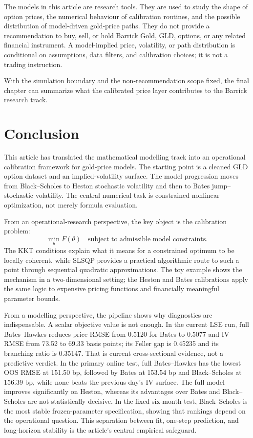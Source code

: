 \documentclass[a4paper,10pt,titlepage,oneside,openany]{book}
\theoremstyle{plain}
\theoremstyle{definition}
\theoremstyle{remark}
\begin{document}
The models in this article are research tools. They are used to study the shape of option prices, the numerical behaviour of calibration routines, and the possible distribution of model-driven gold-price paths. They do not provide a recommendation to buy, sell, or hold Barrick Gold, GLD, options, or any related financial instrument. A model-implied price, volatility, or path distribution is conditional on assumptions, data filters, and calibration choices; it is not a trading instruction.

With the simulation boundary and the non-recommendation scope fixed, the final chapter can summarize what the calibrated price layer contributes to the Barrick research track.


\chapter*{Conclusion}
{}

This article has translated the mathematical modelling track into an operational calibration framework for gold-price models. The starting point is a cleaned GLD option dataset and an implied-volatility surface. The model progression moves from Black--Scholes to Heston stochastic volatility and then to Bates jump--stochastic volatility. The central numerical task is constrained nonlinear optimization, not merely formula evaluation.

From an operational-research perspective, the key object is the calibration problem:
\[
    \min_\theta F(\theta)
    \quad\text{subject to admissible model constraints}.
\]
The KKT conditions explain what it means for a constrained optimum to be locally coherent, while SLSQP provides a practical algorithmic route to such a point through sequential quadratic approximations. The toy example shows the mechanism in a two-dimensional setting; the Heston and Bates calibrations apply the same logic to expensive pricing functions and financially meaningful parameter bounds.

From a modelling perspective, the pipeline shows why diagnostics are indispensable. A scalar objective value is not enough. In the current LSE run, full Bates--Hawkes reduces price RMSE from 0.5120 for Bates to 0.5077 and IV RMSE from 73.52 to 69.33 basis points; its Feller gap is 0.45235 and its branching ratio is 0.35147. That is current cross-sectional evidence, not a predictive verdict. In the primary online test, full Bates--Hawkes has the lowest OOS RMSE at 151.50 bp, followed by Bates at 153.54 bp and Black--Scholes at 156.39 bp, while none beats the previous day's IV surface. The full model improves significantly on Heston, whereas its advantages over Bates and Black--Scholes are not statistically decisive. In the fixed six-month test, Black--Scholes is the most stable frozen-parameter specification, showing that rankings depend on the operational question. This separation between fit, one-step prediction, and long-horizon stability is the article's central empirical safeguard.
\end{document}
